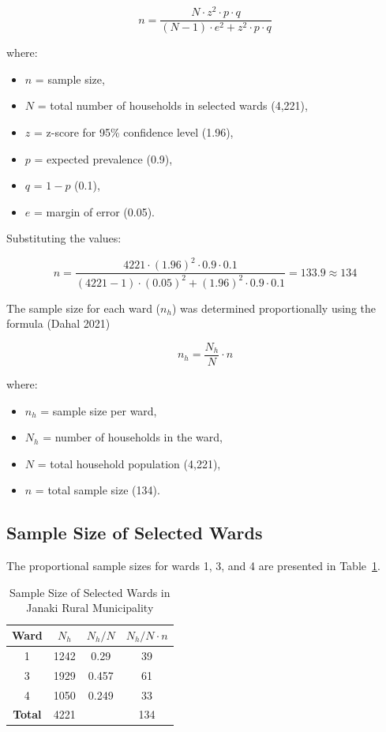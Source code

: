 \[
n = \frac{N \cdot z^2 \cdot p \cdot q}{(N - 1) \cdot e^2 + z^2 \cdot p \cdot q}
\]

where:
\begin{itemize}
    \item $n$ = sample size,
    \item $N$ = total number of households in selected wards (4,221),
    \item $z$ = z-score for 95\% confidence level (1.96),
    \item $p$ = expected prevalence (0.9),
    \item $q$ = $1 - p$ (0.1),
    \item $e$ = margin of error (0.05).
\end{itemize}

Substituting the values:

\[
n = \frac{4221 \cdot (1.96)^2 \cdot 0.9 \cdot 0.1}{(4221 - 1) \cdot (0.05)^2 + (1.96)^2 \cdot 0.9 \cdot 0.1} = 133.9 \approx 134
\]

The sample size for each ward ($n_h$) was determined proportionally using the formula (Dahal 2021)

\[
n_h = \frac{N_h}{N} \cdot n
\]

where:
\begin{itemize}
    \item $n_h$ = sample size per ward,
    \item $N_h$ = number of households in the ward,
    \item $N$ = total household population (4,221),
    \item $n$ = total sample size (134).
\end{itemize}

\subsection{Sample Size of Selected Wards}  
The proportional sample sizes for wards 1, 3, and 4 are presented in Table~\ref{tab:sample_size_wards}.


\begin{table}[h]
\centering
\caption{Sample Size of Selected Wards in Janaki Rural Municipality}
\label{tab:sample_size_wards}
\begin{tabular}{|c|c|c|c|}
\hline
\textbf{Ward} & \textbf{$N_h$} & \textbf{$N_h / N$} & \textbf{$N_h / N \cdot n$} \\ \hline
1 & 1242 & 0.29 & 39 \\ \hline
3 & 1929 & 0.457 & 61 \\ \hline
4 & 1050 & 0.249 & 33 \\ \hline
\textbf{Total} & 4221 & & 134 \\ \hline
\end{tabular}
\end{table}

